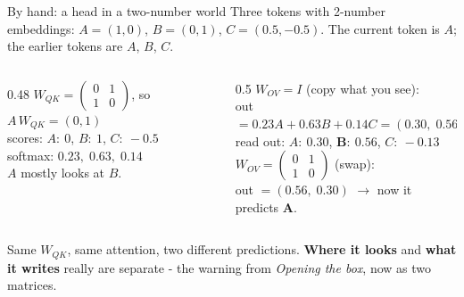 \documentclass[aspectratio=169]{beamer}
\newcommand{\keybox}[1]{%
  \begin{tcolorbox}[colback=armblue!8, colframe=armblue, boxrule=0.6pt, arc=2pt]
  #1
  \end{tcolorbox}}
\begin{document}
\begin{frame}{By hand: a head in a two-number world}
  \vspace{0.1em}
  Three tokens with 2-number embeddings: $A = (1, 0)$, $B = (0, 1)$, $C = (0.5, -0.5)$. The
  current token is $A$; the earlier tokens are $A$, $B$, $C$.

  \vspace{0.3em}
  \begin{columns}[T]
    \begin{column}{0.48\textwidth}
      \small
      $W_{QK} = \begin{pmatrix} 0 & 1\\ 1 & 0 \end{pmatrix}$, so $A\,W_{QK} = (0, 1)$\\[0.4em]
      scores: $A{:}\ 0$, \; $B{:}\ 1$, \; $C{:}\ -0.5$\\[0.2em]
      softmax: $0.23,\; \mathbf{0.63},\; 0.14$\\[0.2em]
      \textcolor{popblue}{$A$ mostly looks at $B$.}
    \end{column}
    \begin{column}{0.5\textwidth}
      \small
      $W_{OV} = I$ (copy what you see):\\
      out $= 0.23A + 0.63B + 0.14C = (0.30,\; 0.56)$\\[0.2em]
      read out: $A{:}\ 0.30$, \; $\mathbf{B{:}\ 0.56}$, \; $C{:}\ -0.13$\\[0.4em]
      $W_{OV} = \begin{pmatrix} 0 & 1\\ 1 & 0 \end{pmatrix}$ (swap):\\
      out $= (0.56,\; 0.30)$ $\rightarrow$ now it predicts $\mathbf{A}$.
    \end{column}
  \end{columns}

  \vspace{0.6em}
  \keybox{\small Same $W_{QK}$, same attention, two different predictions. \textbf{Where it looks}
  and \textbf{what it writes} really are separate - the warning from \emph{Opening the box}, now as
  two matrices.}
\end{frame}
\end{document}
